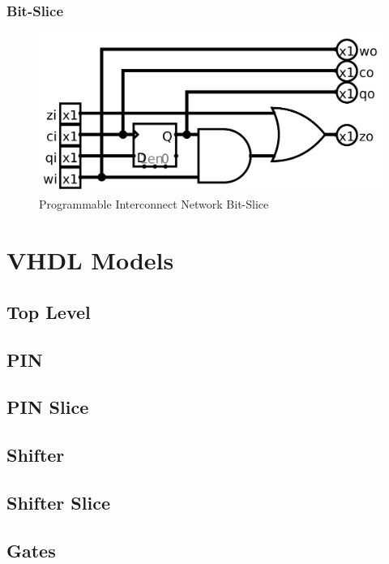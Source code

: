 \documentclass{article}
\begin{document}
        \subsubsection{Bit-Slice}
        \begin{figure}[H]
            \centering
            \includegraphics[width=\linewidth]{../../logisim/pin_slice.png}
            \caption{Programmable Interconnect Network Bit-Slice}
        \end{figure}


\section{VHDL Models}
\subsection{Top Level}
\subsection{PIN}

\subsection{PIN Slice}

\subsection{Shifter}

\subsection{Shifter Slice}

\subsection{Gates}




\end{document}
